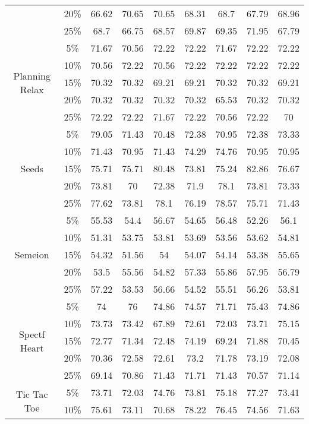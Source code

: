 \begin{longtable}[c]{|c|c|c|c|c|c|c|c|c|}
& 20\% & 66.62 & 70.65 & 70.65 & 68.31 & 68.7 & 67.79 & 68.96 \\
& 25\% & 68.7 & 66.75 & 68.57 & 69.87 & 69.35 & 71.95 & 67.79 \\ \hline
\multirow{5}{*}{Planning Relax}
& 5\% & 71.67 & 70.56 & 72.22 & 72.22 & 71.67 & 72.22 & 72.22 \\ 
& 10\% & 70.56 & 72.22 & 70.56 & 72.22 & 72.22 & 72.22 & 72.22 \\
& 15\% & 70.32 & 70.32 & 69.21 & 69.21 & 70.32 & 70.32 & 69.21 \\
& 20\% & 70.32 & 70.32 & 70.32 & 70.32 & 65.53 & 70.32 & 70.32 \\
& 25\% & 72.22 & 72.22 & 71.67 & 72.22 & 70.56 & 72.22 & 70 \\ \hline
\multirow{5}{*}{Seeds}
& 5\% & 79.05 & 71.43 & 70.48 & 72.38 & 70.95 & 72.38 & 73.33 \\ 
& 10\% & 71.43 & 70.95 & 71.43 & 74.29 & 74.76 & 70.95 & 70.95 \\
& 15\% & 75.71 & 75.71 & 80.48 & 73.81 & 75.24 & 82.86 & 76.67 \\
& 20\% & 73.81 & 70 & 72.38 & 71.9 & 78.1 & 73.81 & 73.33 \\
& 25\% & 77.62 & 73.81 & 78.1 & 76.19 & 78.57 & 75.71 & 71.43 \\ \hline
\multirow{5}{*}{Semeion}
& 5\% & 55.53 & 54.4 & 56.67 & 54.65 & 56.48 & 52.26 & 56.1 \\ 
& 10\% & 51.31 & 53.75 & 53.81 & 53.69 & 53.56 & 53.62 & 54.81 \\
& 15\% & 54.32 & 51.56 & 54 & 54.07 & 54.14 & 53.38 & 55.65 \\
& 20\% & 53.5 & 55.56 & 54.82 & 57.33 & 55.86 & 57.95 & 56.79 \\
& 25\% & 57.22 & 53.53 & 56.66 & 54.52 & 55.51 & 56.26 & 53.81 \\ \hline
\multirow{5}{*}{Spectf Heart}
& 5\% & 74 & 76 & 74.86 & 74.57 & 71.71 & 75.43 & 74.86 \\ 
& 10\% & 73.73 & 73.42 & 67.89 & 72.61 & 72.03 & 73.71 & 75.15 \\
& 15\% & 72.77 & 71.34 & 72.48 & 74.19 & 69.24 & 71.88 & 70.45 \\
& 20\% & 70.36 & 72.58 & 72.61 & 73.2 & 71.78 & 73.19 & 72.08 \\
& 25\% & 69.14 & 70.86 & 71.43 & 71.71 & 71.43 & 70.57 & 71.14 \\ \hline
\multirow{5}{*}{Tic Tac Toe}
& 5\% & 73.71 & 72.03 & 74.76 & 73.81 & 75.18 & 77.27 & 73.41 \\ 
& 10\% & 75.61 & 73.11 & 70.68 & 78.22 & 76.45 & 74.56 & 71.63 \\

\end{longtable}
